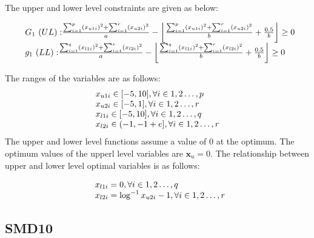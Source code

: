 The upper and lower level constraints are given as below:

\begin{equation}
\begin{array}{lr}
\text{}\hspace{2mm} {G_1~(UL):} {\frac{\sum_{i=1}^{p} (x_{u1i})^{2} +\sum_{	i=1}^{r} (x_{u2i})^{2} }{a}} - \floor*{{{\frac{\sum_{	i=1}^{p} (x_{u1i})^{2} +\sum_{	i=1}^{r} (x_{u2i})^{2} }{b}} + {\frac{0.5}{b}}}} \geq 0\\
\text{}\hspace{2mm} {g_1~(LL):} {\frac{\sum_{	i=1}^{q} (x_{l1i})^{2} +\sum_{	i=1}^{r} (x_{l2i})^{2} }{a}} - \floor*{{{\frac{\sum_{	i=1}^{q} (x_{l1i})^{2} +\sum_{	i=1}^{r} (x_{l2i})^{2} }{b}} + {\frac{0.5}{b}}}} \geq 0
\end{array}
\label{smd_9_con}
\end{equation}

The ranges of the variables are as follows:
\begin{equation}
\begin{array}{lr}
$$x_{u1i} \in  [-5,10],          \forall i \in {1,2\ldots,p}$$\\
$$x_{u2i} \in  [-5,1],          \forall i \in {1,2\ldots,r}$$\\
$$x_{l1i} \in  [-5,10],          \forall i \in {1,2\ldots,q}$$\\
$$x_{l2i} \in  (-1,-1+e],          \forall i \in {1,2\ldots,r}$$
\end{array}
\label{smd_9_boun}
\end{equation}
The upper and lower level functions assume a value of 0 at the optimum. The optimum values of the upperl level variables are $\mathbf{x}_u=0$. The relationship between upper and lower level optimal variables is as follows: 

\begin{equation}
\begin{array}{lr}
\text{}\hspace{2mm} x_{l1i}=0,  \forall i \in {1,2\ldots,q} \\
\text{}\hspace{2mm} x_{l2i}=\log^{ - 1} x_{u2i}-1,  \forall i \in {1,2\ldots,r} \\
\end{array}
\label{basic_9}
\end{equation}

\subsection{SMD10}

